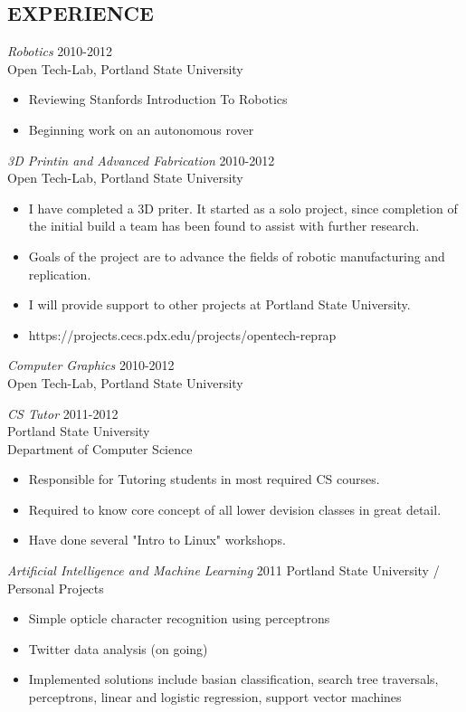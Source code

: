 \documentclass[margin]{res}
\begin{document}
\begin{resume}
\section{EXPERIENCE}
				{\sl Robotics} \hfill 2010-2012 \\
                Open Tech-Lab, Portland State University
				\begin{itemize}  \itemsep -2pt %
					\item   Reviewing Stanfords Introduction To Robotics
					\item	Beginning work on an autonomous rover
				\end{itemize}	
				{\sl 3D Printin and Advanced Fabrication} \hfill 2010-2012 \\
                Open Tech-Lab, Portland State University
				\begin{itemize}  \itemsep -2pt %
					\item   I have completed a 3D priter. It started as a solo project, 
							since completion of the initial build a team has been found to
							assist with further research.
					\item  	Goals of the project are to advance the fields of 
					 		robotic manufacturing and replication.
					\item	I will provide support to other projects at Portland State University.
					\item   https://projects.cecs.pdx.edu/projects/opentech-reprap
				\end{itemize}					
				{\sl Computer Graphics} \hfill 2010-2012 \\
                Open Tech-Lab, Portland State University
				\begin{itemize}  \itemsep -2pt %
				{\sl CS Tutor} \hfill 2011-2012 \\ 
				Portland State University \\
				Department of Computer Science
				\begin{itemize}	\itemsep -2pt
					\item	Responsible for Tutoring students in most required CS courses.
					\item	Required to know core concept of all lower devision classes in great detail.
					\item	Have done several "Intro to Linux" workshops.
				\end{itemize}
 				
				{\sl Artificial Intelligence and Machine Learning} \hfill 2011
				Portland State University / Personal Projects
				\begin{itemize} \itemsep -2pt
					\item	Simple opticle character recognition using perceptrons
					\item	Twitter data analysis (on going)
					\item 	Implemented solutions include basian classification, search tree traversals, perceptrons, linear and logistic regression,
							support vector machines %
				\end{itemize}
				

\end{itemize}
\end{resume}
\end{document}
